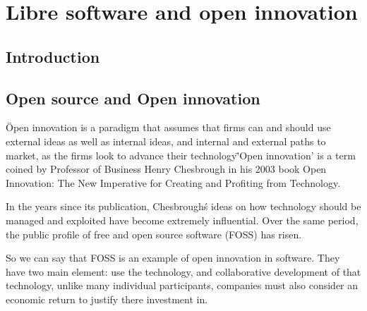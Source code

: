 \chapter{Libre software and open innovation}

\section{Introduction}\label{lesson-5-introduction}

 

\section{Open source and Open innovation} \label{Open source and Open innovation}
\"Open innovation is a paradigm that assumes that firms can and should use external ideas as well as internal ideas, and internal and external paths to market, as the firms look to advance their technology\"
'Open innovation' is a term coined by Professor of Business Henry Chesbrough in his 2003 book Open Innovation: The New Imperative for Creating and Profiting from Technology. 

In the years since its publication, Chesbrough\'s ideas on how technology should be managed and exploited have become extremely influential. Over the same period, the public profile of free and open source software (FOSS) has risen. 

So we can say that FOSS is an example of open innovation in software.
They have two main element: use the technology, and collaborative development of that technology, unlike many individual participants, companies must also consider an economic return to justify there investment in.


